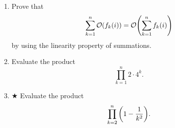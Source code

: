 \documentclass[AppendixA]{subfiles}
\begin{document}
\begin{enumerate}[leftmargin=\labelsep]
\begin{answer}
		\end{answer}
		
		\item Prove that
		\[
			\sum_{k = 1}^n \mathcal{O}(f_k(i)) = \mathcal{O}\qty(\sum_{k = 1}^n f_k(i))
		\]
		by using the linearity property of summations.
		\begin{answer}
			
		\end{answer}
		
		\item Evaluate the product
		\[
			\prod_{k = 1}^n 2 \cdot 4^k.
		\]
		\begin{answer}
			
		\end{answer}
		
		\item $\bigstar$ Evaluate the product
		\[
			\prod_{k = 2}^n \qty(1 - \frac{1}{k^2}).
		\]
		\begin{answer}
			
		\end{answer}
	\end{enumerate}
\end{document}

